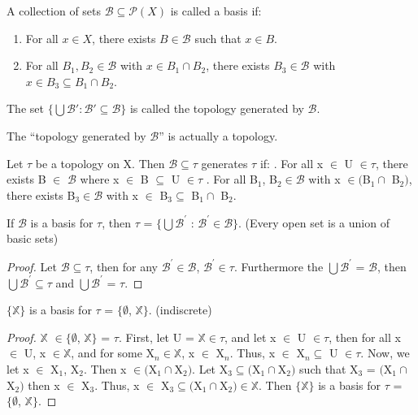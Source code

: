 \documentclass{article}
\begin{document}
	\begin{definition}
		A collection of sets \(\mathcal{B}\subseteq\mathcal{P}(X)\) is
		called a basis if:
		\begin{enumerate}
			\item For all \(x\in X\), there exists \(B\in\mathcal{B}\) such that
			\(x\in B\).
			\item  For all \(B_1,B_2 \in \mathcal{B}\) with \(x \in B_1 \cap B_2\), there exists \(B_3 \in \mathcal{B}\) with
			\(x\in B_3 \subseteq B_1 \cap B_2\).
		\end{enumerate}
	  The set \(\{\bigcup\mathcal{B}':\mathcal{B}'\subseteq\mathcal{B}\}\)
		is called the topology generated by \(\mathcal{B}\).
	\end{definition}

	\begin{theorem}
		The ``topology generated by \(\mathcal{B}\)'' is actually a topology.
	\end{theorem}

	\begin{theorem}
	Let $\tau$ be a topology on X. Then $\mathcal{B} \subseteq \tau$ generates $\tau$ if:
	. For all x $\in$ U $\in \tau$, there exists B $\in$ $\mathcal{B}$ where x $\in$ B $\subseteq$ U $\in \tau$
	. For all B$_1$, B$_2 \in \mathcal{B}$ with x $\in ($B$_1 \cap$ B$_2)$, there exists B$_3 \in \mathcal{B}$ with x $\in$ B$_3 \subseteq$ B$_1 \cap$ B$_2$.
\end{theorem}

	\begin{theorem}
	If $\mathcal{B}$ is a basis for $\tau$, then $\tau$ = $\lbrace \bigcup \mathcal{B}^{'}$ : $\mathcal{B}^{'} \in \mathcal{B} \rbrace$. (Every open set is a union of basic sets)
	\end{theorem}
	\begin{proof}
	Let $\mathcal{B} \subseteq \tau$, then for any $\mathcal{B}^{'} \in \mathcal{B}$, $\mathcal{B}^{'} \in \tau$. Furthermore the $\bigcup \mathcal{B}^{'}$ = $\mathcal{B}$, then $\bigcup \mathcal{B}^{'} \subseteq \tau$ and $\bigcup \mathcal{B}^{'}$ = $\tau$.
	\end{proof}

	\begin{theorem}
	$\lbrace\mathbb{X}\rbrace$ is a basis for $\tau$ = $\lbrace\emptyset$, $\mathbb{X}\rbrace$. (indiscrete)
	\end{theorem}
	\begin{proof}
	$\mathbb{X}$ $\in \lbrace \emptyset$, $\mathbb{X}\rbrace$ = $\tau$. First, let U = $\mathbb{X} \in \tau$, and let x $\in$ U $\in \tau$, then for all x $\in$ U, x $\in \mathbb{X}$, and for some X$_n \in \mathbb{X}$, x $\in$ X$_n$. Thus, x $\in$ X$_n \subseteq$ U $\in \tau$. Now, we let x $\in$ X$_1$, X$_2$. Then x $\in ($X$_1 \cap $X$_2)$. Let X$_3 \subseteq ($X$_1 \cap $X$_2)$ such that X$_3$ = $($X$_1 \cap$ X$_2)$ then x $\in$ X$_3$. Thus, x $\in$ X$_3 \subseteq ($X$_1 \cap $X$_2) \in \mathbb{X}$. Then $\lbrace \mathbb{X} \rbrace$ is a basis for $\tau$ = $\lbrace \emptyset$, $\mathbb{X} \rbrace$.
	\end{proof}
\end{document}
